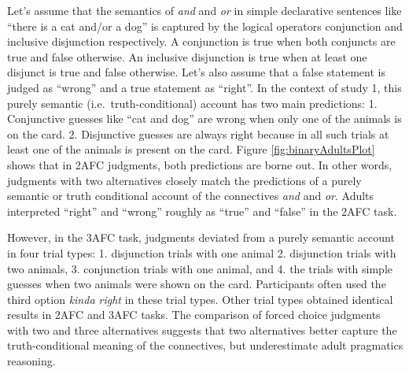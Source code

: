 \documentclass[oneside]{report}
\theoremstyle{definition}
\theoremstyle{definition}
\theoremstyle{definition}
\theoremstyle{remark}
\begin{document}
Let's assume that the semantics of \emph{and} and \emph{or} in simple
declarative sentences like ``there is a cat and/or a dog'' is captured
by the logical operators conjunction and inclusive disjunction
respectively. A conjunction is true when both conjuncts are true and
false otherwise. An inclusive disjunction is true when at least one
disjunct is true and false otherwise. Let's also assume that a false
statement is judged as ``wrong'' and a true statement as ``right''. In
the context of study 1, this purely semantic (i.e.~truth-conditional)
account has two main predictions: 1. Conjunctive guesses like ``cat and
dog'' are wrong when only one of the animals is on the card. 2.
Disjunctive guesses are always right because in all such trials at least
one of the animals is present on the card. Figure
\ref{fig:binaryAdultsPlot} shows that in 2AFC judgments, both
predictions are borne out. In other words, judgments with two
alternatives closely match the predictions of a purely semantic or truth
conditional account of the connectives \emph{and} and \emph{or}. Adults
interpreted ``right'' and ``wrong'' roughly as ``true'' and ``false'' in
the 2AFC task.

However, in the 3AFC task, judgments deviated from a purely semantic
account in four trial types: 1. disjunction trials with one animal 2.
disjunction trials with two animals, 3. conjunction trials with one
animal, and 4. the trials with simple guesses when two animals were
shown on the card. Participants often used the third option \emph{kinda
right} in these trial types. Other trial types obtained identical
results in 2AFC and 3AFC tasks. The comparison of forced choice
judgments with two and three alternatives suggests that two alternatives
better capture the truth-conditional meaning of the connectives, but
underestimate adult pragmatics reasoning.
\end{document}
